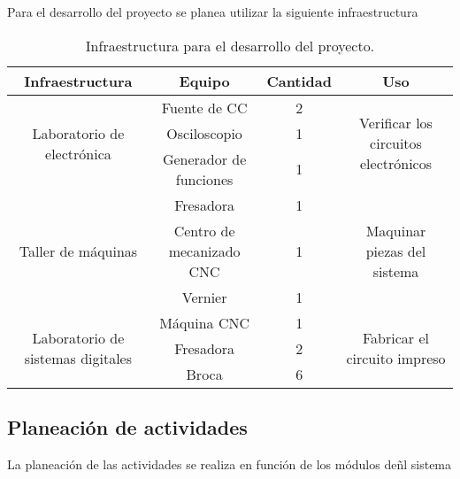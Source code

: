 Para el desarrollo del proyecto se planea utilizar la siguiente infraestructura
\begin{table}[!ht]
	\centering
	\caption{Infraestructura para el desarrollo del proyecto.}
	\begin{tabular}{c c c c }
		\toprule
		              \textbf{Infraestructura}                & \textbf{Equipo}          & \textbf{Cantidad} & \textbf{Uso}                                             \\ \midrule
		   \multirow{3}{25mm}{Laboratorio de electrónica}     & Fuente de CC             & 2                 & \multirow{3}{40mm}{Verificar los circuitos electrónicos} \\
		                                                      & Osciloscopio             & 1                 &                                                          \\
		                                                      & Generador de funciones   & 1                 &                                                          \\ \midrule
		       \multirow{3}{20mm}{Taller de máquinas}         & Fresadora                & 1                 & \multirow{3}{40mm}{Maquinar piezas del sistema}          \\
		                                                      & Centro de mecanizado CNC & 1                 &                                                          \\
		                                                      & Vernier                  & 1                 &                                                          \\ \midrule
		\multirow{3}{25mm}{Laboratorio de sistemas digitales} & Máquina CNC              & 1                 & \multirow{3}{40mm}{Fabricar el circuito impreso}         \\
		                                                      & Fresadora                & 2                 &                                                          \\
		                                                      & Broca                    & 6                 &                                                          \\ \bottomrule
	\end{tabular}
\end{table}

\subsection{Planeación de actividades}
La planeación de las actividades se realiza en función de los módulos deñl sistema

